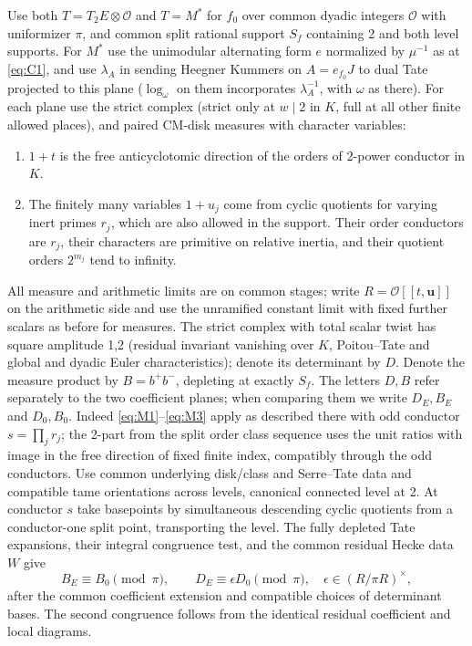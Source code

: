 Use both \(T=T_2 E\otimes\mathcal O\) and \(T=M^*\) for \(f_0\) over common dyadic integers \(\mathcal O\) with uniformizer \(\pi\), and common split rational support \(S_f\) containing 2 and both level supports. For \(M^*\) use the unimodular alternating form \(e\) normalized by \(\mu^{-1}\) as at \eqref{eq:C1}, and use \(\lambda_A\) in sending Heegner Kummers on \(A=e_{f_0}J\) to dual Tate projected to this plane (\(\log_\omega\) on them incorporates \(\lambda_A^{-1}\), with \(\omega\) as there). For each plane use the strict complex (strict only at \(w\mid2\) in \(K\), full at all other finite allowed places), and paired CM-disk measures with character variables:
\begin{enumerate}[label=\textup{(\roman*)}]
\item \(1+t\) is the free anticyclotomic direction of the orders of 2-power conductor in \(K\).
\item The finitely many variables \(1+u_j\) come from cyclic quotients for varying inert primes \(r_j\), which are also allowed in the support. Their order conductors are \(r_j\), their characters are primitive on relative inertia, and their quotient orders \(2^{m_j}\) tend to infinity.
\end{enumerate}

All measure and arithmetic limits are on common stages; write \(R=\mathcal O[[t,\mathbf u]]\) on the arithmetic side and use the unramified constant limit with fixed further scalars as before for measures. The strict complex with total scalar twist has square amplitude 1,2 (residual invariant vanishing over \(K\), Poitou--Tate and global and dyadic Euler characteristics); denote its determinant by \(D\). Denote the measure product by \(B=b^+b^-\), depleting at exactly \(S_f\). The letters \(D,B\) refer separately to the two coefficient planes; when comparing them we write \(D_E,B_E\) and \(D_0,B_0\). Indeed \eqref{eq:M1}--\eqref{eq:M3} apply as described there with odd conductor \(s=\prod_j r_j\); the 2-part from the split order class sequence uses the unit ratios with image in the free direction of fixed finite index, compatibly through the odd conductors. Use common underlying disk/class and Serre--Tate data and compatible tame orientations across levels, canonical connected level at 2. At conductor \(s\) take basepoints by simultaneous descending cyclic quotients from a conductor-one split point, transporting the level. The fully depleted Tate expansions, their integral congruence test, and the common residual Hecke data \(W\) give
\[
 B_E\equiv B_0\pmod\pi,\qquad
 D_E\equiv\epsilon D_0\pmod\pi,
 \quad \epsilon\in(R/\pi R)^\times,
\]
after the common coefficient extension and compatible choices of determinant bases. The second congruence follows from the identical residual coefficient and local diagrams.

